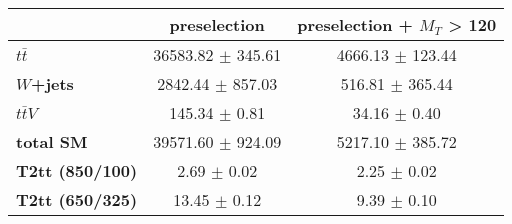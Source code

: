 \begin{tabular}{|l|cc|}
\hline
&
\textbf{preselection}     &
\textbf{preselection + $M_{T}$ > 120} \\
\hline
\textbf{$t\bar{t}$}      & 36583.82 $\pm$ 345.61     & 4666.13 $\pm$ 123.44  \\
\textbf{$W$+jets}        & 2842.44 $\pm$ 857.03      & 516.81 $\pm$ 365.44   \\
\textbf{$t\bar{t}V$}     & 145.34 $\pm$ 0.81         & 34.16 $\pm$ 0.40      \\
\hline
\textbf{total SM}        & 39571.60 $\pm$ 924.09     & 5217.10 $\pm$ 385.72  \\
\hline
\textbf{T2tt (850/100)}  & 2.69 $\pm$ 0.02           & 2.25 $\pm$ 0.02       \\
\textbf{T2tt (650/325)}  & 13.45 $\pm$ 0.12          & 9.39 $\pm$ 0.10       \\
\hline
\end{tabular}
